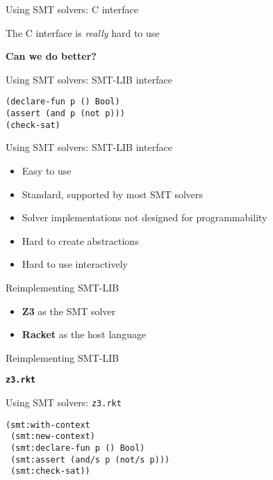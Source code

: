 \documentclass{beamer}
\begin{document}
\begin{frame}{Using SMT solvers: C interface}
\begin{center}
The C interface is \textit{really} hard to use

\pause
\textbf{Can we do better?}
\end{center}
\end{frame}

\begin{frame}[fragile]{Using SMT solvers: SMT-LIB interface}
\begin{verbatim}
(declare-fun p () Bool)
(assert (and p (not p)))
(check-sat)
\end{verbatim}
\end{frame}

\begin{frame}{Using SMT solvers: SMT-LIB interface}
\begin{itemize}
\item Easy to use
\item Standard, supported by most SMT solvers
\pause
\item Solver implementations not designed for programmability
\pause
\item Hard to create abstractions
\item Hard to use interactively
\end{itemize}
\end{frame}

\begin{frame}{Reimplementing SMT-LIB}
\begin{itemize}
\item \textbf{Z3} as the SMT solver
\pause
\item \textbf{Racket} as the host language
\end{itemize}
\end{frame}

\begin{frame}{Reimplementing SMT-LIB}
\begin{center}
\LARGE \texttt{\textbf{z3.rkt}} 
\end{center}
\end{frame}

\begin{frame}[fragile]{Using SMT solvers: \texttt{z3.rkt}}
\begin{verbatim}
(smt:with-context
 (smt:new-context)
 (smt:declare-fun p () Bool)
 (smt:assert (and/s p (not/s p)))
 (smt:check-sat))
\end{verbatim}
\end{frame}
\end{document}

